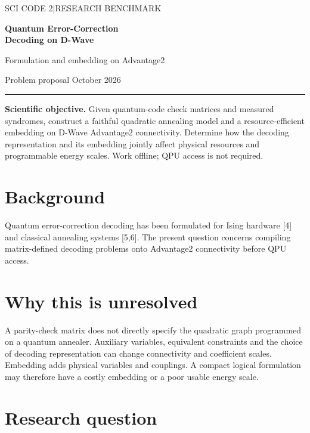 \documentclass[11pt,letterpaper]{article}
\begin{document}
\thispagestyle{plain}
{\color{accent}\small\sffamily SCI CODE 2\quad|\quad RESEARCH BENCHMARK}\par\vspace{8pt}
{\LARGE\bfseries Quantum Error-Correction\\[2pt] Decoding on D-Wave}\par\vspace{5pt}
{\large Formulation and embedding on Advantage2}\par\vspace{5pt}
{\small Problem proposal\quad\textbullet{} October 2026}\par\vspace{7pt}
{\color{accent}\hrule}\vspace{10pt}

\textbf{Scientific objective.} Given quantum-code check matrices and measured syndromes, construct a faithful quadratic annealing model and a resource-efficient embedding on D-Wave Advantage2 connectivity. Determine how the decoding representation and its embedding jointly affect physical resources and programmable energy scales. Work offline; QPU access is not required.\par

\section{Background}

Quantum error-correction decoding has been formulated for Ising hardware [4] and classical annealing systems [5,6]. The present question concerns compiling matrix-defined decoding problems onto Advantage2 connectivity before QPU access.\par

\section{Why this is unresolved}

A parity-check matrix does not directly specify the quadratic graph programmed on a quantum annealer. Auxiliary variables, equivalent constraints and the choice of decoding representation can change connectivity and coefficient scales. Embedding adds physical variables and couplings. A compact logical formulation may therefore have a costly embedding or a poor usable energy scale.\par

\section{Research question}
\end{document}
